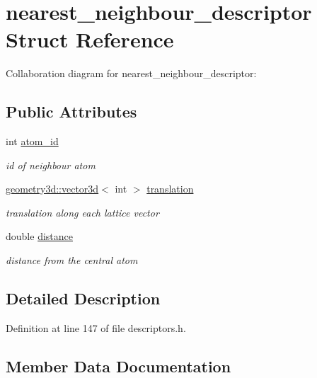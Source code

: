 \hypertarget{structnearest__neighbour__descriptor}{}\section{nearest\+\_\+neighbour\+\_\+descriptor Struct Reference}
\label{structnearest__neighbour__descriptor}


Collaboration diagram for nearest\+\_\+neighbour\+\_\+descriptor\+:
\subsection*{Public Attributes}
\begin{DoxyCompactItemize}
\item 
int \hyperlink{structnearest__neighbour__descriptor_a297e5e0ad16ad6dd1393b4ca4967a1b4}{atom\+\_\+id}
\begin{DoxyCompactList}\small\item\em id of neighbour atom \end{DoxyCompactList}\item 
\hyperlink{classgeometry3d_1_1vector3d}{geometry3d\+::vector3d}$<$ int $>$ \hyperlink{structnearest__neighbour__descriptor_ac72858701e17806cc6c1c61a5c669cf0}{translation}
\begin{DoxyCompactList}\small\item\em translation along each lattice vector \end{DoxyCompactList}\item 
double \hyperlink{structnearest__neighbour__descriptor_a43fa51aa108a05b87b18c08e5a1101cf}{distance}
\begin{DoxyCompactList}\small\item\em distance from the central atom \end{DoxyCompactList}\end{DoxyCompactItemize}


\subsection{Detailed Description}


Definition at line 147 of file descriptors.\+h.



\subsection{Member Data Documentation}
\hypertarget{structnearest__neighbour__descriptor_a297e5e0ad16ad6dd1393b4ca4967a1b4}{}
